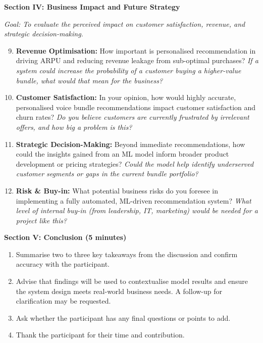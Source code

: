 \vspace{0.3cm}
\textbf{Section IV: Business Impact and Future Strategy}

\textit{Goal: To evaluate the perceived impact on customer satisfaction, revenue, and strategic decision-making.}

\begin{enumerate}
    \setcounter{enumi}{8}
    \item \textbf{Revenue Optimisation:} How important is personalised recommendation in driving ARPU and reducing revenue leakage from sub-optimal purchases? \textit{If a system could increase the probability of a customer buying a higher-value bundle, what would that mean for the business?}

    \item \textbf{Customer Satisfaction:} In your opinion, how would highly accurate, personalised voice bundle recommendations impact customer satisfaction and churn rates? \textit{Do you believe customers are currently frustrated by irrelevant offers, and how big a problem is this?}

    \item \textbf{Strategic Decision-Making:} Beyond immediate recommendations, how could the insights gained from an ML model inform broader product development or pricing strategies? \textit{Could the model help identify underserved customer segments or gaps in the current bundle portfolio?}

    \item \textbf{Risk \& Buy-in:} What potential business risks do you foresee in implementing a fully automated, ML-driven recommendation system? \textit{What level of internal buy-in (from leadership, IT, marketing) would be needed for a project like this?}
\end{enumerate}

\vspace{0.3cm}
\textbf{Section V: Conclusion (5 minutes)}
\begin{enumerate}
    \item Summarise two to three key takeaways from the discussion and confirm accuracy with the participant.
    \item Advise that findings will be used to contextualise model results and ensure the system design meets real-world business needs. A follow-up for clarification may be requested.
    \item Ask whether the participant has any final questions or points to add.
    \item Thank the participant for their time and contribution.
\end{enumerate}
